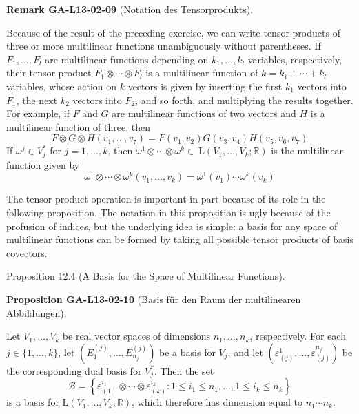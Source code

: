 \documentclass[10pt, letterpaper]{article}
\newcommand{\CustomHeading}[3]{%
  \par\medskip\noindent%
  \textbf{#1 #2} \textnormal{(#3)}.\enskip%
}
\newenvironment{PROP}[2]{\begin{unitbox}\CustomHeading{Proposition}{#1}{#2}}{\end{unitbox}}
\newenvironment{REM}[2]{\begin{unitbox}\CustomHeading{Remark}{#1}{#2}}{\end{unitbox}}
\begin{document}
\begin{REM}{GA-L13-02-09}{Notation des Tensorprodukts}
Because of the result of the preceding exercise, we can write tensor products of three or more multilinear functions unambiguously without parentheses. If $F_{1}, \ldots, F_{l}$ are multilinear functions depending on $k_{1}, \ldots, k_{l}$ variables, respectively, their tensor product $F_{1} \otimes \cdots \otimes F_{l}$ is a multilinear function of $k=k_{1}+\cdots+k_{l}$ variables, whose action on $k$ vectors is given by inserting the first $k_{1}$ vectors into $F_{1}$, the next $k_{2}$ vectors into $F_{2}$, and so forth, and multiplying the results together. For example, if $F$ and $G$ are multilinear functions of two vectors and $H$ is a multilinear function of three, then
$$
F \otimes G \otimes H\left(v_{1}, \ldots, v_{7}\right)=F\left(v_{1}, v_{2}\right) G\left(v_{3}, v_{4}\right) H\left(v_{5}, v_{6}, v_{7}\right)
$$
If $\omega^{j} \in V_{j}^{*}$ for $j=1, \ldots, k$, then $\omega^{1} \otimes \cdots \otimes \omega^{k} \in \mathrm{~L}\left(V_{1}, \ldots, V_{k} ; \mathbb{R}\right)$ is the multilinear function given by
$$
\omega^{1} \otimes \cdots \otimes \omega^{k}\left(v_{1}, \ldots, v_{k}\right)=\omega^{1}\left(v_{1}\right) \cdots \omega^{k}\left(v_{k}\right)
$$
\end{REM}



The tensor product operation is important in part because of its role in the following proposition. The notation in this proposition is ugly because of the profusion of indices, but the underlying idea is simple: a basis for any space of multilinear functions can be formed by taking all possible tensor products of basis covectors.


Proposition 12.4 (A Basis for the Space of Multilinear Functions). 


\begin{PROP}{GA-L13-02-10}{Basis für den Raum der multilinearen Abbildungen}
Let $V_{1}, \ldots, V_{k}$ be real vector spaces of dimensions $n_{1}, \ldots, n_{k}$, respectively. For each $j \in\{1, \ldots, k\}$, let $\left(E_{1}^{(j)}, \ldots, E_{n_{j}}^{(j)}\right)$ be a basis for $V_{j}$, and let $\left(\varepsilon_{(j)}^{1}, \ldots, \varepsilon_{(j)}^{n_{j}}\right)$ be the corresponding dual basis for $V_{j}^{*}$. Then the set
$$
\mathcal{B}=\left\{\varepsilon_{(1)}^{i_{1}} \otimes \cdots \otimes \varepsilon_{(k)}^{i_{k}}: 1 \leq i_{1} \leq n_{1}, \ldots, 1 \leq i_{k} \leq n_{k}\right\}
$$
is a basis for $\mathrm{L}\left(V_{1}, \ldots, V_{k} ; \mathbb{R}\right)$, which therefore has dimension equal to $n_{1} \cdots n_{k}$.
\end{PROP}
\end{document}
